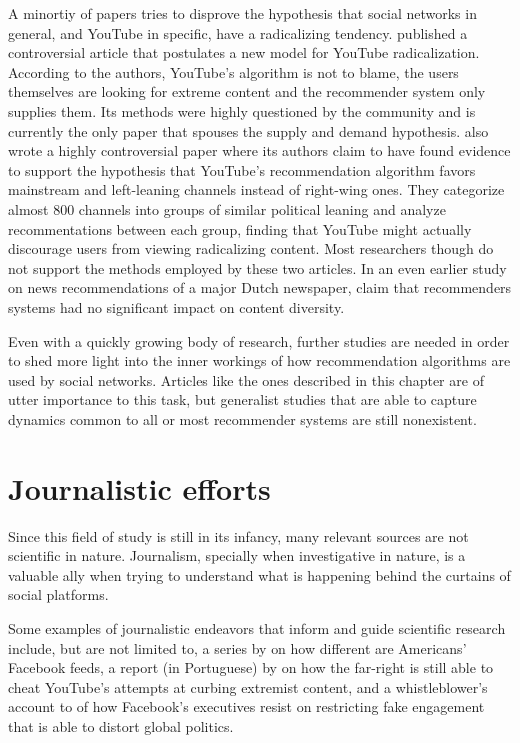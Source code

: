 A minortiy of papers tries to disprove the hypothesis that social networks in
general, and YouTube in specific, have a radicalizing tendency.
\citet{munger_right-wing_2020} published a controversial article that postulates
a new model for YouTube radicalization. According to the authors, YouTube's
algorithm is not to blame, the users themselves are looking for extreme content
and the recommender system only supplies them. Its methods were highly
questioned by the community and is currently the only paper that spouses the
supply and demand hypothesis. \citet{ledwich_algorithmic_2019} also wrote a
highly controversial paper where its authors claim to have found evidence to
support the hypothesis that YouTube's recommendation algorithm favors mainstream
and left-leaning channels instead of right-wing ones. They categorize almost 800
channels into groups of similar political leaning and analyze recommentations
between each group, finding that YouTube might actually discourage users from
viewing radicalizing content. Most researchers though do not support the methods
employed by these two articles. In an even earlier study on news recommendations
of a major Dutch newspaper, \citet{moller_not_2018} claim that recommenders
systems had no significant impact on content diversity.

Even with a quickly growing body of research, further studies are needed in
order to shed more light into the inner workings of how recommendation
algorithms are used by social networks. Articles like the ones described in this
chapter are of utter importance to this task, but generalist studies that are
able to capture dynamics common to all or most recommender systems are still
nonexistent.

\section{Journalistic efforts}
\label{cap:journalistic}

Since this field of study is still in its infancy, many relevant sources are not
scientific in nature. Journalism, specially when investigative in nature, is a
valuable ally when trying to understand what is happening behind the curtains of
social platforms.

Some examples of journalistic endeavors that inform and guide scientific
research include, but are not limited to, a series by \citet{lecher_one_nodate}
on how different are Americans' Facebook feeds, a report (in Portuguese) by
\citet{ribeiro_como_2021} on how the far-right is still able to cheat YouTube's
attempts at curbing extremist content, and a whistleblower's account to
\citet{wong_how_2021} of how Facebook's executives resist on restricting
fake engagement that is able to distort global politics.

